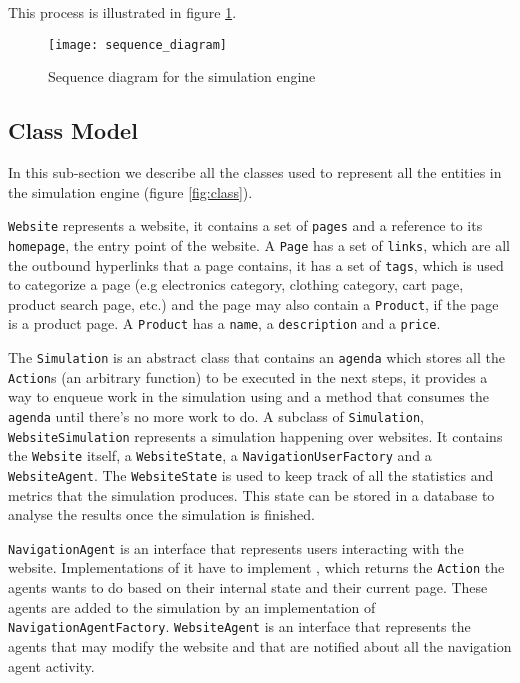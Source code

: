 This process is illustrated in figure \ref{fig:sequence_diagram}. 

\begin{figure}[h]
    \begin{center}
        \leavevmode
        \texttt{[image: sequence\_diagram]}
        \caption{Sequence diagram for the simulation engine}
        \label{fig:sequence_diagram}
    \end{center}
\end{figure}

\subsection{Class Model}

In this sub-section we describe all the classes used to represent all the 
entities in the simulation engine (figure \ref{fig:class}).

\texttt{Website} represents a website, it contains a set of \texttt{pages} and 
a reference to its \texttt{homepage}, the entry point of the website. A 
\texttt{Page} has a set of \texttt{links}, which are all the outbound 
hyperlinks that a page contains, it has a set of \texttt{tags}, which is used 
to categorize a page (e.g electronics category, clothing category, cart page, 
product search page, etc.) and the page may also contain a \texttt{Product}, if 
the page is a product page. A \texttt{Product} has a \texttt{name}, a 
\texttt{description} and a \texttt{price}.

The \texttt{Simulation} is an abstract class that contains an \texttt{agenda} 
which stores all the \texttt{Action}s (an arbitrary function) to be executed in 
the next steps, it provides a way to enqueue work in the simulation using 
 and a  method that consumes 
the \texttt{agenda} until there's no more work to do. A subclass of 
\texttt{Simulation}, \texttt{WebsiteSimulation} represents a simulation 
happening over websites. It contains the \texttt{Website} itself, a 
\texttt{WebsiteState}, a \texttt{NavigationUserFactory} and a 
\texttt{WebsiteAgent}. The \texttt{WebsiteState} is used to keep track of all 
the statistics and metrics that the simulation produces. This state can be 
stored in a database to analyse the results once the simulation is finished.

\texttt{NavigationAgent} is an interface that represents users interacting with 
the website. Implementations of it have to implement , 
which returns the \texttt{Action} the agents wants to do based on their 
internal state and their current page. These agents are added to the simulation 
by an implementation of \texttt{NavigationAgentFactory}. \texttt{WebsiteAgent} 
is an interface that represents the agents that may modify the website and that 
are notified about all the navigation agent activity.

